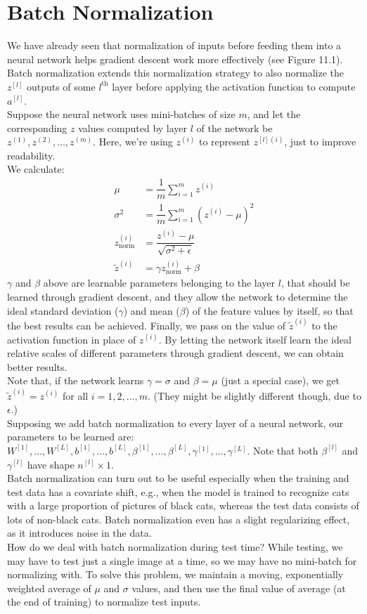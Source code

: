\documentclass[a4paper, 12pt]{report}
\begin{document}
\section{Batch Normalization}
We have already seen that normalization of inputs before feeding them into a neural network helps gradient descent work more effectively (see Figure 11.1). Batch normalization extends this normalization strategy to also normalize the $z^{[l]}$ outputs of some $l^{\text{th}}$ layer before applying the activation function to compute $a^{[l]}$.\\
\break
Suppose the neural network uses mini-batches of size $m$, and let the corresponding $z$ values computed by layer $l$ of the network be $z^{(1)}, z^{(2)}, \dots, z^{(m)}$. Here, we're using $z^{(i)}$ to represent $z^{[l](i)}$, just to improve readability.\\
\break
We calculate:
\begin{align*}
\mu &= \dfrac{1}{m}\sum_{i=1}^{m}z^{(i)}\\
\sigma^2 &= \dfrac{1}{m}\sum_{i=1}^{m}(z^{(i)}-\mu)^2\\
z^{(i)}_{\text{norm}} &= \dfrac{z^{(i)}-\mu}{\sqrt{\sigma^2+\epsilon}}\\
\tilde{z}^{(i)} &= \gamma z^{(i)}_{\text{norm}} + \beta
\end{align*}
$\gamma$ and $\beta$ above are learnable parameters belonging to the layer $l$, that should be learned through gradient descent, and they allow the network to determine the ideal standard deviation ($\gamma$) and mean ($\beta$) of the feature values by itself, so that the best results can be achieved. Finally, we pass on the value of $\tilde{z}^{(i)}$ to the activation function in place of $z^{(i)}$. By letting the network itself learn the ideal relative scales of different parameters through gradient descent, we can obtain better results.\\
\break
Note that, if the network learns $\gamma = \sigma$ and $\beta = \mu$ (just a special case), we get $\tilde{z}^{(i)}=z^{(i)}$ for all $i=1,2,\dots,m$. (They might be slightly different though, due to $\epsilon$.)\\
\break
Supposing we add batch normalization to every layer of a neural network, our parameters to be learned are: $W^{[1]},\dots, W^{[L]}, b^{[1]},\dots, b^{[L]}, \beta^{[1]},\dots, \beta^{[L]}, \gamma^{[1]},\dots, \gamma^{[L]}$. Note that both $\beta^{[l]}$ and $\gamma^{[l]}$ have shape $n^{[l]}\times 1$.\\
\break
Batch normalization can turn out to be useful especially when the training and test data has a covariate shift, e.g., when the model is trained to recognize cats with a large proportion of pictures of black cats, whereas the test data consists of lots of non-black cats. Batch normalization even has a slight regularizing effect, as it introduces noise in the data.\\
\break
How do we deal with batch normalization during test time? While testing, we may have to test just a single image at a time, so we may have no mini-batch for normalizing with. To solve this problem, we maintain a moving, exponentially weighted average of $\mu$ and $\sigma$ values, and then use the final value of average (at the end of training) to normalize test inputs.
\end{document}
